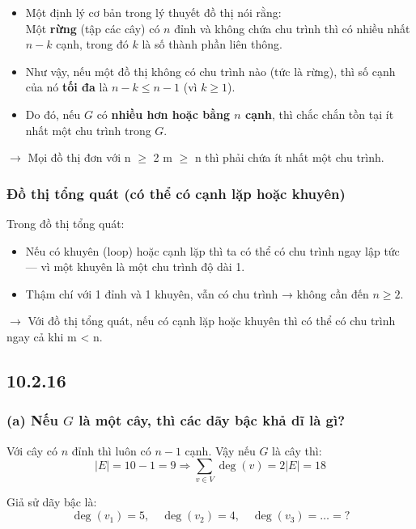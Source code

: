 \documentclass{article}
\begin{document}
	\begin{itemize}
		\item Một định lý cơ bản trong lý thuyết đồ thị nói rằng: \\
		Một \textbf{rừng} (tập các cây) có $n$ đỉnh và không chứa chu trình thì có nhiều nhất $n - k$ cạnh, trong đó $k$ là số thành phần liên thông.
		
		\item Như vậy, nếu một đồ thị không có chu trình nào (tức là rừng), thì số cạnh của nó \textbf{tối đa} là $n - k \leq n - 1$ (vì $k \geq 1$).
		
		\item Do đó, nếu $G$ có \textbf{nhiều hơn hoặc bằng $n$ cạnh}, thì chắc chắn tồn tại ít nhất một chu trình trong $G$.
	\end{itemize}
	
	
	$\rightarrow$ Mọi đồ thị đơn với  n $\geq$ 2  m $\geq$ n \text thì phải chứa ít nhất một chu trình.
	
	\subsubsection*{Đồ thị tổng quát (có thể có cạnh lặp hoặc khuyên)}
	
	Trong đồ thị tổng quát:
	\begin{itemize}
		\item Nếu có khuyên (loop) hoặc cạnh lặp thì ta có thể có chu trình ngay lập tức — vì một khuyên là một chu trình độ dài 1.
		\item Thậm chí với 1 đỉnh và 1 khuyên, vẫn có chu trình → không cần đến $n \geq 2$.
	\end{itemize}
	
	$\rightarrow$ Với đồ thị tổng quát, nếu có cạnh lặp hoặc khuyên thì có thể có chu trình ngay cả khi m < n.
	
	\subsection*{10.2.16}
	\subsubsection*{(a) Nếu $G$ là một cây, thì các dãy bậc khả dĩ là gì?}
	Với cây có $n$ đỉnh thì luôn có $n - 1$ cạnh.  
	Vậy nếu $G$ là cây thì:
	\[
	|E| = 10 - 1 = 9 \Rightarrow \sum_{v \in V} \deg(v) = 2|E| = 18
	\]
	
	Giả sử dãy bậc là:
	\[
	\deg(v_1) = 5, \quad \deg(v_2) = 4, \quad \deg(v_3) = \dots = ?
	\]
	
\end{document}
